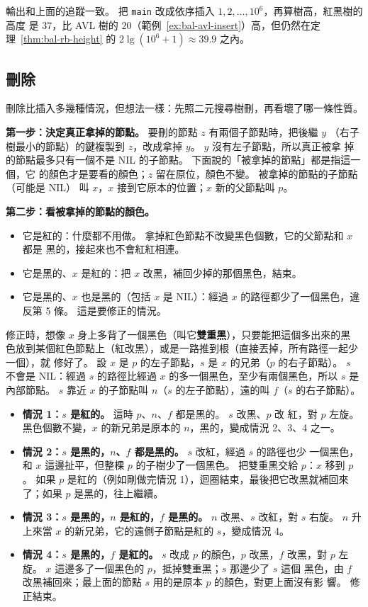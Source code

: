 輸出和上面的追蹤一致。 把 \texttt{main} 改成依序插入 $1, 2, \ldots, 10^6$，再算樹高，紅黑樹的高度
是 $37$，比 AVL 樹的 $20$（範例~\ref{ex:bal-avl-insert}）高，但仍然在定
理~\ref{thm:bal-rb-height} 的 $2 \lg(10^6+1) \approx 39.9$ 之內。

\subsection{刪除}
\label{sec:bal-rb-delete}

刪除比插入多幾種情況，但想法一樣：先照二元搜尋樹刪，再看壞了哪一條性質。

\textbf{第一步：決定真正拿掉的節點。} 要刪的節點 $z$ 有兩個子節點時，把後繼 $y$
（右子樹最小的節點）的鍵複製到 $z$，改成拿掉 $y$。 $y$ 沒有左子節點，所以真正被拿
掉的節點最多只有一個不是 NIL 的子節點。 下面說的「被拿掉的節點」都是指這一個，它
的顏色才是要看的顏色；$z$ 留在原位，顏色不變。 被拿掉的節點的子節點（可能是 NIL）
叫 $x$，$x$ 接到它原本的位置；$x$ 新的父節點叫 $p$。

\textbf{第二步：看被拿掉的節點的顏色。}
\begin{itemize}
\item 它是紅的：什麼都不用做。 拿掉紅色節點不改變黑色個數，它的父節點和 $x$ 都是
黑的，接起來也不會紅紅相連。
\item 它是黑的、$x$ 是紅的：把 $x$ 改黑，補回少掉的那個黑色，結束。
\item 它是黑的、$x$ 也是黑的（包括 $x$ 是 NIL）：經過 $x$ 的路徑都少了一個黑色，違
反第 5 條。 這是要修正的情況。
\end{itemize}

修正時，想像 $x$ 身上多背了一個黑色（叫它\textbf{雙重黑}），只要能把這個多出來的黑
色放到某個紅色節點上（紅改黑），或是一路推到根（直接丟掉，所有路徑一起少一個），就
修好了。 設 $x$ 是 $p$ 的左子節點，$s$ 是 $x$ 的兄弟（$p$ 的右子節點）。 $s$ 不會是
NIL：經過 $s$ 的路徑比經過 $x$ 的多一個黑色，至少有兩個黑色，所以 $s$ 是內部節點。
$s$ 靠近 $x$ 的子節點叫 $n$（$s$ 的左子節點），遠的叫 $f$（$s$ 的右子節點）。

\begin{itemize}
\item \textbf{情況 1：$s$ 是紅的。} 這時 $p$、$n$、$f$ 都是黑的。 $s$ 改黑、$p$ 改
紅，對 $p$ 左旋。 黑色個數不變，$x$ 的新兄弟是原本的 $n$，黑的，變成情況 2、3、4
之一。
\item \textbf{情況 2：$s$ 是黑的，$n$、$f$ 都是黑的。} $s$ 改紅，經過 $s$ 的路徑也少
一個黑色，和 $x$ 這邊扯平，但整棵 $p$ 的子樹少了一個黑色。 把雙重黑交給 $p$：$x$
移到 $p$。 如果 $p$ 是紅的（例如剛做完情況 1），迴圈結束，最後把它改黑就補回來
了；如果 $p$ 是黑的，往上繼續。
\item \textbf{情況 3：$s$ 是黑的，$n$ 是紅的，$f$ 是黑的。} $n$ 改黑、$s$ 改紅，對
$s$ 右旋。 $n$ 升上來當 $x$ 的新兄弟，它的遠側子節點是紅的 $s$，變成情況 4。
\item \textbf{情況 4：$s$ 是黑的，$f$ 是紅的。} $s$ 改成 $p$ 的顏色，$p$ 改黑，$f$
改黑，對 $p$ 左旋。 $x$ 這邊多了一個黑色的 $p$，抵掉雙重黑；$s$ 那邊少了 $s$ 這個
黑色，由 $f$ 改黑補回來；最上面的節點 $s$ 用的是原本 $p$ 的顏色，對更上面沒有影
響。 修正結束。
\end{itemize}

